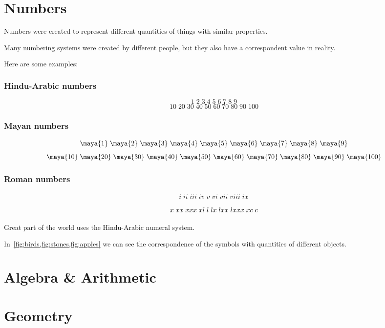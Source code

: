 
\chapter{Numbers}

Numbers were created to represent different quantities of things with similar properties.

Many numbering systems were created by different people, but they also have a correspondent value in reality.

Here are some examples:
\subsection{Hindu-Arabic numbers}
\[
  {1}\;
  {2}\;
  {3}\;
  {4}\;
  {5}\;
  {6}\;
  {7}\;
  {8}\;
  {9}
\]
\[
  {10}\;
  {20}\;
  {30}\;
  {40}\;
  {50}\;
  {60}\;
  {70}\;
  {80}\;
  {90}\;
  {100}
\]

\subsection{Mayan numbers}
\[
  \maya{1}\;
  \maya{2}\;
  \maya{3}\;
  \maya{4}\;
  \maya{5}\;
  \maya{6}\;
  \maya{7}\;
  \maya{8}\;
  \maya{9}
\]
\[
  \maya{10}\;
  \maya{20}\;
  \maya{30}\;
  \maya{40}\;
  \maya{50}\;
  \maya{60}\;
  \maya{70}\;
  \maya{80}\;
  \maya{90}\;
  \maya{100}
\]

\subsection{Roman numbers}
\[
  \rom{1}\;
  \rom{2}\;
  \rom{3}\;
  \rom{4}\;
  \rom{5}\;
  \rom{6}\;
  \rom{7}\;
  \rom{8}\;
  \rom{9}
\]
\[
  \rom{10}\;
  \rom{20}\;
  \rom{30}\;
  \rom{40}\;
  \rom{50}\;
  \rom{60}\;
  \rom{70}\;
  \rom{80}\;
  \rom{90}\;
  \rom{100}
\]

Great part of the world uses the Hindu-Arabic numeral system.

In~\ref{fig:birds,fig:stones,fig:apples} we can see the correspondence of the symbols with quantities of different objects.


\chapter{Algebra \& Arithmetic}
\chapter{Geometry}
